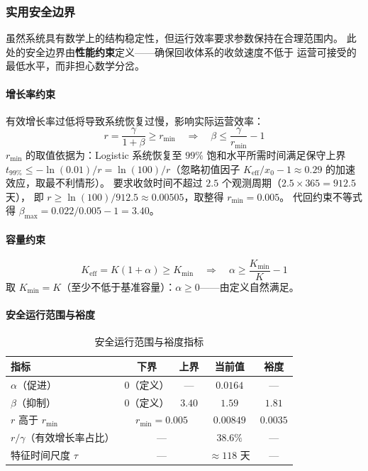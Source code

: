\documentclass[12pt,a4paper]{ctexart}
\begin{document}
\begin{table}[htbp]
\subsubsection{实用安全边界}

虽然系统具有数学上的结构稳定性，但运行效率要求参数保持在合理范围内。
此处的安全边界由\textbf{性能约束}定义——确保回收体系的收敛速度不低于
运营可接受的最低水平，而非担心数学分岔。

\paragraph{增长率约束}

有效增长率过低将导致系统恢复过慢，影响实际运营效率：
\begin{equation}
r = \frac{\gamma}{1+\beta} \geq r_{\min} \quad\Rightarrow\quad
\beta \leq \frac{\gamma}{r_{\min}} - 1
\end{equation}
$r_{\min}$ 的取值依据为：Logistic 系统恢复至 $99\%$ 饱和水平所需时间满足保守上界
$t_{99\%} \leq -\ln(0.01)/r = \ln(100)/r$（忽略初值因子
$K_{\text{eff}}/x_0-1 \approx 0.29$ 的加速效应，取最不利情形）。
要求收敛时间不超过 $2.5$ 个观测周期（$2.5 \times 365 = 912.5$ 天），
即 $r \geq \ln(100)/912.5 \approx 0.00505$，取整得 $r_{\min} = 0.005$。
代回约束不等式得 $\beta_{\max} = 0.022/0.005 - 1 = 3.40$。

\paragraph{容量约束}
\begin{equation}
K_{\text{eff}} = K(1+\alpha) \geq K_{\min} \quad\Rightarrow\quad
\alpha \geq \frac{K_{\min}}{K} - 1
\end{equation}
取 $K_{\min} = K$（至少不低于基准容量）：$\alpha \geq 0$——由定义自然满足。

\paragraph{安全运行范围与裕度}

\begin{table}[htbp]
\centering
\caption{安全运行范围与裕度指标}
\label{tab:safety_margins}
\begin{tabular}{lcccc}
\toprule
指标 & 下界 & 上界 & 当前值 & 裕度 \\
\midrule
$\alpha$（促进） & $0$（定义） & — & $0.0164$ & — \\
$\beta$（抑制） & $0$（定义） & $3.40$ & $1.59$ & $1.81$ \\
\midrule
$r$ 高于 $r_{\min}$ & \multicolumn{2}{c}{$r_{\min}=0.005$} & $0.00849$ & $0.0035$ \\
$r/\gamma$（有效增长率占比）& \multicolumn{2}{c}{—} & $38.6\%$ & — \\
特征时间尺度 $\tau$ & \multicolumn{2}{c}{—} & $\approx 118$ 天 & — \\
\bottomrule
\end{tabular}
\end{table}


\end{table}
\end{document}
